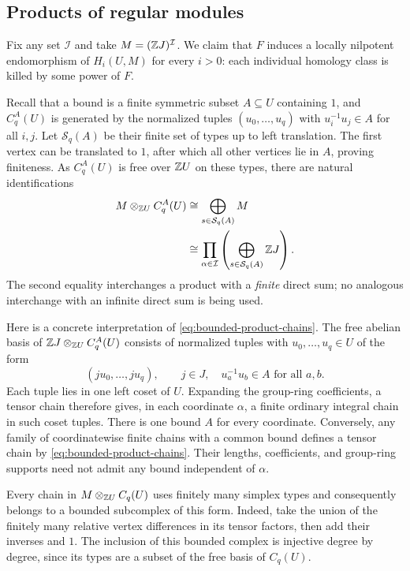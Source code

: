 \subsection{Products of regular modules}

Fix any set $\mathcal I$ and take $M=(\mathbb Z J)^{\mathcal I}$.
We claim that $F$ induces a locally nilpotent endomorphism of
$H_i(U,M)$ for every $i>0$: each individual homology class is
killed by some power of $F$.

Recall that a bound is a finite symmetric subset $A\subseteq U$
containing $1$, and $C_q^A(U)$ is generated by the normalized
tuples $(u_0,\ldots,u_q)$ with $u_i^{-1}u_j\in A$ for all $i,j$.
Let $\mathcal S_q(A)$ be their finite set of types up to left
translation.  The first vertex can be translated to $1$, after
which all other vertices lie in $A$, proving finiteness.  As
$C_q^A(U)$ is free over $\mathbb Z U$ on these types, there are natural
identifications
\begin{equation}\label{eq:bounded-product-chains}
 \begin{split}
 M\otimes_{\mathbb Z U}C_q^A(U)
 &\cong\bigoplus_{s\in\mathcal S_q(A)}M\\
 &\cong\prod_{\alpha\in\mathcal I}
      \left(\bigoplus_{s\in\mathcal S_q(A)}\mathbb Z J\right).
 \end{split}
\end{equation}
The second equality interchanges a product with a \emph{finite}
direct sum; no analogous interchange with an infinite direct sum
is being used.

Here is a concrete interpretation of
\eqref{eq:bounded-product-chains}.  The free abelian basis of
$\mathbb Z J\otimes_{\mathbb Z U}C_q^A(U)$ consists of normalized tuples with
$u_0,\ldots,u_q\in U$ of the form
\[
 (ju_0,\ldots,ju_q),\qquad j\in J,
 \quad u_a^{-1}u_b\in A\text{ for all }a,b.
\]
Each tuple lies in one left coset of $U$.  Expanding the group-ring
coefficients, a tensor chain therefore gives, in each coordinate
$\alpha$, a finite ordinary integral chain in such coset tuples.
There is one bound $A$ for every coordinate.  Conversely, any
family of coordinatewise finite chains with a common bound
defines a tensor chain by \eqref{eq:bounded-product-chains}.
Their lengths, coefficients, and group-ring supports need not
admit any bound independent of $\alpha$.

Every chain in $M\otimes_{\mathbb Z U}C_q(U)$ uses finitely many
simplex types and consequently belongs to a bounded subcomplex
of this form.  Indeed, take the union of the finitely many
relative vertex differences in its tensor factors, then add
their inverses and $1$.  The inclusion of this bounded complex
is injective degree by degree, since its types are a subset of
the free basis of $C_q(U)$.

